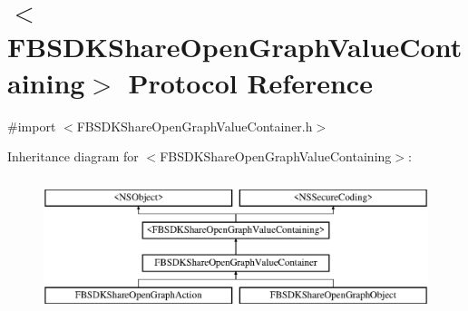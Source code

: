 \hypertarget{protocol_f_b_s_d_k_share_open_graph_value_containing-p}{}\section{$<$F\+B\+S\+D\+K\+Share\+Open\+Graph\+Value\+Containing$>$ Protocol Reference}
\label{protocol_f_b_s_d_k_share_open_graph_value_containing-p}


{\ttfamily \#import $<$F\+B\+S\+D\+K\+Share\+Open\+Graph\+Value\+Container.\+h$>$}

Inheritance diagram for $<$F\+B\+S\+D\+K\+Share\+Open\+Graph\+Value\+Containing$>$\+:\begin{figure}[H]
\begin{center}
\leavevmode
\includegraphics[height=4.000000cm]{protocol_f_b_s_d_k_share_open_graph_value_containing-p}
\end{center}
\end{figure}
